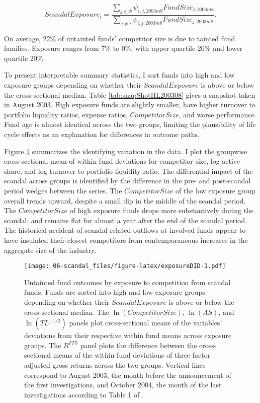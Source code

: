 \documentclass[openany]{book}
\theoremstyle{definition}
\theoremstyle{definition}
\theoremstyle{definition}
\theoremstyle{remark}
\begin{document}
\begin{equation}
ScandalExposure_i = \frac{\sum_{j\in \Phi} \psi_{i,j,2003m8} FundSize_{j,2003m8}}{\sum_{j\neq i}\psi_{i,j,2003m8} FundSize_{j,2003m8}}.
\end{equation}

On average, 22\% of untainted funds' competitor size is due to tainted
fund families. Exposure ranges from 7\% to 0\%, with upper quartile 26\%
and lower quartile 20\%.

To present interpretable summary statistics, I sort funds into high and
low exposure groups depending on whether their \(ScandalExposure\) is
above or below the cross-sectional median. Table
\ref{tab:snapShotHL200308} gives a snapshot taken in August 2003. High
exposure funds are slightly smaller, have higher turnover to portfolio
liquidity ratios, expense ratios, \(CompetitorSize\), and worse
performance. Fund age is almost identical across the two groups,
limiting the plausibility of life cycle effects as an explanation for
differences in outcome paths.

Figure \ref{fig:exposureDID} summarizes the identifying variation in the
data. I plot the groupwise cross-sectional mean of within-fund
deviations for competitor size, log active share, and log turnover to
portfolio liquidity ratio. The differential impact of the scandal across
groups is identified by the difference in the pre- and post-scandal
period wedges between the series. The \(CompetitorSize\) of the low
exposure group overall trends upward, despite a small dip in the middle
of the scandal period. The \(CompetitorSize\) of high exposure funds
drops more substantively during the scandal, and remains flat for almost
a year after the end of the scandal period. The historical accident of
scandal-related outflows at involved funds appear to have insulated
their closest competitors from contemporaneous increases in the
aggregate size of the industry.

\begin{figure}
\centering
\texttt{[image: 06-scandal\_files/figure-latex/exposureDID-1.pdf]}
\caption{\label{fig:exposureDID}Untainted fund outcomes by exposure to
competition from scandal funds. Funds are sorted into high and low
exposure groups depending on whether their \(ScandalExposure\) is above
or below the cross-sectional median. The \(\ln(CompetitorSize)\),
\(\ln(AS)\), and \(\ln(TL^{-1/2})\) panels plot cross-sectional means of
the variables' deviations from their respective within fund means across
exposure groups. The \(R^{FF3}\) panel plots the difference between the
cross-sectional means of the within fund deviations of three factor
adjusted gross returns across the two groups. Vertical lines correspond
to August 2003, the month before the announcement of the first
investigations, and October 2004, the month of the last investigations
according to Table 1 of \citet{hw05}.}
\end{figure}
\end{document}
